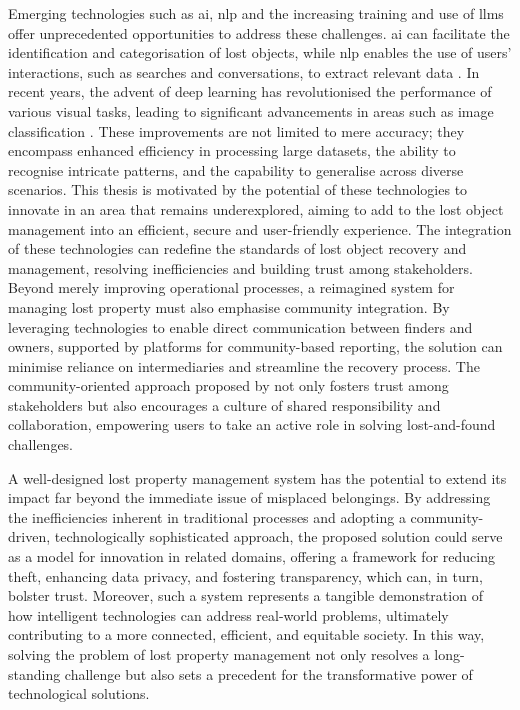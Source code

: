 Emerging technologies such as \ac{ai}, \ac{nlp} and the increasing training and use of \acp{llm} offer unprecedented opportunities to address these challenges. \ac{ai} can facilitate the identification and categorisation of lost objects, while \ac{nlp} enables the use of users' interactions, such as searches and conversations, to extract relevant data \cite{Prawira2024}. In recent years, the advent of deep learning has revolutionised the performance of various visual tasks, leading to significant advancements in areas such as image classification \cite{Liu2022}. These improvements are not limited to mere accuracy; they encompass enhanced efficiency in processing large datasets, the ability to recognise intricate patterns, and the capability to generalise across diverse scenarios. This thesis is motivated by the potential of these technologies to innovate in an area that remains underexplored, aiming to add to the lost object management into an efficient, secure and user-friendly experience. The integration of these technologies can redefine the standards of lost object recovery and management, resolving inefficiencies and building trust among stakeholders. Beyond merely improving operational processes, a reimagined system for managing lost property must also emphasise community integration. By leveraging technologies to enable direct communication between finders and owners, supported by platforms for community-based reporting, the solution can minimise reliance on intermediaries and streamline the recovery process. The community-oriented approach proposed by  not only fosters trust among stakeholders but also encourages a culture of shared responsibility and collaboration, empowering users to take an active role in solving lost-and-found challenges.

A well-designed lost property management system has the potential to extend its impact far beyond the immediate issue of misplaced belongings. By addressing the inefficiencies inherent in traditional processes and adopting a community-driven, technologically sophisticated approach, the proposed solution could serve as a model for innovation in related domains, offering a framework for reducing theft, enhancing data privacy, and fostering transparency, which can, in turn, bolster trust. Moreover, such a system represents a tangible demonstration of how intelligent technologies can address real-world problems, ultimately contributing to a more connected, efficient, and equitable society. In this way, solving the problem of lost property management not only resolves a long-standing challenge but also sets a precedent for the transformative power of technological solutions.

